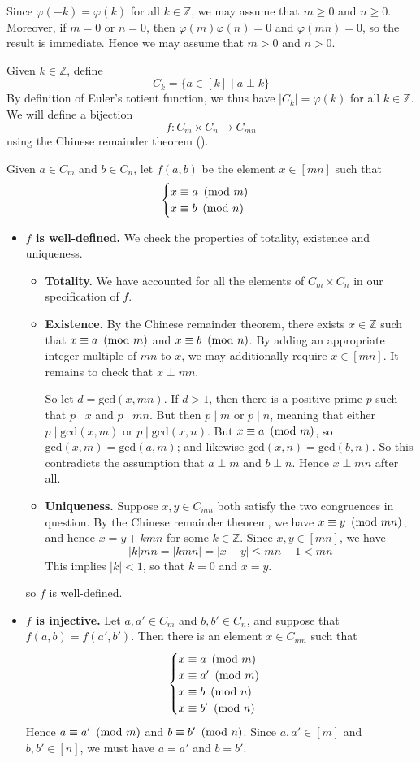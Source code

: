 \begin{cproof}
Since $\varphi(-k)=\varphi(k)$ for all $k \in \mathbb{Z}$, we may assume that $m \ge 0$ and $n \ge 0$. Moreover, if $m=0$ or $n=0$, then $\varphi(m)\varphi(n)=0$ and $\varphi(mn)=0$, so the result is immediate. Hence we may assume that $m>0$ and $n>0$.

Given $k \in \mathbb{Z}$, define
\[ C_k = \{ a \in [k] \mid a \perp k \} \]
By definition of Euler's totient function, we thus have $|C_k| = \varphi(k)$ for all $k \in \mathbb{Z}$. We will define a bijection
\[ f : C_m \times C_n \to C_{mn} \]
using the Chinese remainder theorem ().

Given $a \in C_m$ and $b \in C_n$, let $f(a, b)$ be the element $x \in [mn]$ such that
\[ \begin{cases} x \equiv a ~\left(\text{mod}~m\right) \\ x \equiv b ~\left(\text{mod}~n\right) \end{cases} \]
\begin{itemize}
\item \textbf{$f$ is well-defined.} We check the properties of totality, existence and uniqueness.
\begin{itemize}
\item \textbf{Totality.} We have accounted for all the elements of $C_m \times C_n$ in our specification of $f$.
\item \textbf{Existence.} By the Chinese remainder theorem, there exists $x \in \mathbb{Z}$ such that $x \equiv a ~\left(\text{mod}~m\right)$ and $x \equiv b ~\left(\text{mod}~n\right)$. By adding an appropriate integer multiple of $mn$ to $x$, we may additionally require $x \in [mn]$. It remains to check that $x \perp mn$.

So let $d=\mathrm{gcd}(x,mn)$. If $d>1$, then there is a positive prime $p$ such that $p \mid x$ and $p \mid mn$. But then $p \mid m$ or $p \mid n$, meaning that either $p \mid \mathrm{gcd}(x,m)$ or $p \mid \mathrm{gcd}(x,n)$. But $x \equiv a ~\left(\text{mod}~m\right)$, so $\mathrm{gcd}(x,m) = \mathrm{gcd}(a,m)$; and likewise $\mathrm{gcd}(x,n) = \mathrm{gcd}(b,n)$. So this contradicts the assumption that $a \perp m$ and $b \perp n$. Hence $x \perp mn$ after all.
\item \textbf{Uniqueness.} Suppose $x,y \in C_{mn}$ both satisfy the two congruences in question. By the Chinese remainder theorem, we have $x \equiv y ~\left(\text{mod}~mn\right)$, and hence $x=y+kmn$ for some $k \in \mathbb{Z}$. Since $x,y \in [mn]$, we have
\[ |k|mn = |kmn| = |x-y| \le mn-1 < mn \]
This implies $|k| < 1$, so that $k=0$ and $x=y$.
\end{itemize}
so $f$ is well-defined.
\item \textbf{$f$ is injective.} Let $a,a' \in C_m$ and $b,b' \in C_n$, and suppose that $f(a,b)=f(a',b')$. Then there is an element $x \in C_{mn}$ such that
\[ \begin{cases} x \equiv a ~\left(\text{mod}~m\right) \\ x \equiv a' ~\left(\text{mod}~m\right) \\ x \equiv b ~\left(\text{mod}~n\right) \\ x \equiv b' ~\left(\text{mod}~n\right) \end{cases} \]
Hence $a \equiv a' ~\left(\text{mod}~m\right)$ and $b \equiv b' ~\left(\text{mod}~n\right)$. Since $a,a' \in [m]$ and $b,b' \in [n]$, we must have $a=a'$ and $b=b'$.


\end{itemize}
\end{cproof}
